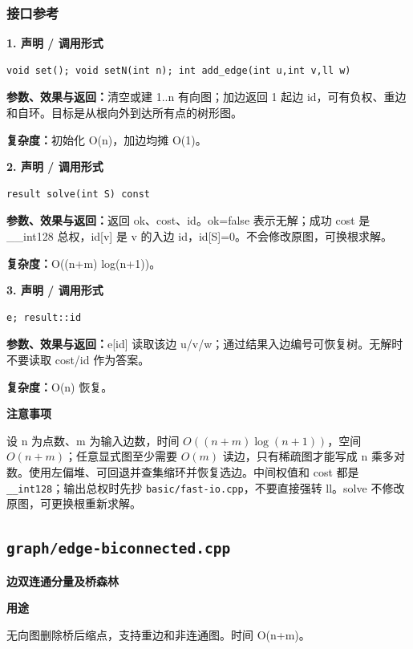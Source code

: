 \documentclass[UTF8,a4paper,10pt]{ctexart}
\newcommand{\TemplUsage}[1]{\textbf{用途}\par #1\par}
\newcommand{\TemplNote}[1]{\textbf{注意事项}\par #1\par}
\begin{document}
\subsubsection*{接口参考}
\noindent\begin{minipage}{\textwidth}
\textbf{1. 声明 / 调用形式}
\begin{lstlisting}
void set(); void setN(int n); int add_edge(int u,int v,ll w)
\end{lstlisting}
\textbf{参数、效果与返回：}清空或建 1..n 有向图；加边返回 1 起边 id，可有负权、重边和自环。目标是从根向外到达所有点的树形图。

\textbf{复杂度：}初始化 O(n)，加边均摊 O(1)。

\end{minipage}\par\vspace{0.4em}
\noindent\begin{minipage}{\textwidth}
\textbf{2. 声明 / 调用形式}
\begin{lstlisting}
result solve(int S) const
\end{lstlisting}
\textbf{参数、效果与返回：}返回 ok、cost、id。ok=false 表示无解；成功 cost 是 \_\_int128 总权，id[v] 是 v 的入边 id，id[S]=0。不会修改原图，可换根求解。

\textbf{复杂度：}O((n+m) log(n+1))。

\end{minipage}\par\vspace{0.4em}
\noindent\begin{minipage}{\textwidth}
\textbf{3. 声明 / 调用形式}
\begin{lstlisting}
e; result::id
\end{lstlisting}
\textbf{参数、效果与返回：}e[id] 读取该边 u/v/w；通过结果入边编号可恢复树。无解时不要读取 cost/id 作为答案。

\textbf{复杂度：}O(n) 恢复。

\TemplNote{设 n 为点数、m 为输入边数，时间 $O((n+m)\log(n+1))$，空间 $O(n+m)$；任意显式图至少需要 $O(m)$ 读边，只有稀疏图才能写成 n 乘多对数。使用左偏堆、可回退并查集缩环并恢复选边。中间权值和 cost 都是 \texttt{\_\_int128}；输出总权时先抄 \texttt{basic/fast-io.cpp}，不要直接强转 ll。solve 不修改原图，可更换根重新求解。}
\end{minipage}\par\vspace{0.4em}
\clearpage
\subsection{\texttt{graph/edge-biconnected.cpp}}
\textbf{边双连通分量及桥森林}\par
\TemplUsage{无向图删除桥后缩点，支持重边和非连通图。时间 O(n+m)。}
\end{document}
